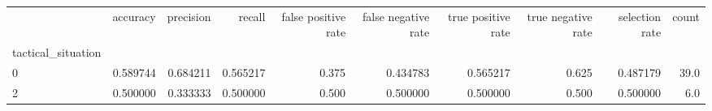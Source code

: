 \begin{tabular}{lrrrrrrrrr}
\toprule
{} &  accuracy &  precision &    recall &  false positive rate &  false negative rate &  true positive rate &  true negative rate &  selection rate &  count \\
tactical\_situation &           &            &           &                      &                      &                     &                     &                 &        \\
\midrule
0                  &  0.589744 &   0.684211 &  0.565217 &                0.375 &             0.434783 &            0.565217 &               0.625 &        0.487179 &   39.0 \\
2                  &  0.500000 &   0.333333 &  0.500000 &                0.500 &             0.500000 &            0.500000 &               0.500 &        0.500000 &    6.0 \\
\bottomrule
\end{tabular}
